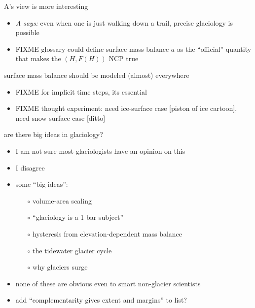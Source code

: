 \documentclass[10pt,hyperref,dvipsnames]{beamer}
\begin{document}
\begin{frame}{A's view is more interesting}
\begin{itemize}
\item \emph{A says:} even when one is just walking down a trail, precise glaciology is possible
\item FIXME glossary could define surface mass balance $a$ as the ``official'' quantity that makes the $(H,F(H))$ NCP true
\end{itemize}
\end{frame}

\begin{frame}{surface mass balance should be modeled (almost) everywhere}
\begin{itemize}
\item FIXME for implicit time steps, its essential
\item FIXME thought experiment: need ice-surface case [piston of ice cartoon], need snow-surface case [ditto]
\end{itemize}
\end{frame}


\begin{frame}{are there big ideas in glaciology?}
\begin{itemize}
\item I am not sure most glaciologists have an opinion on this
\item<2-4> I disagree

\bigskip
\item<3-4> some ``big ideas'':
    \begin{itemize}
    \item[$\circ$] volume-area scaling
    \item[$\circ$] ``glaciology is a 1 bar subject''
    \item[$\circ$] hysteresis from elevation-dependent mass balance
    \item[$\circ$] the tidewater glacier cycle
    \item[$\circ$] why glaciers surge
    \end{itemize}
\item<3-4> none of these are obvious even to smart non-glacier scientists

\bigskip
\item<4> add ``complementarity gives extent and margins'' to list?
\end{itemize}
\end{frame}
\end{document}
